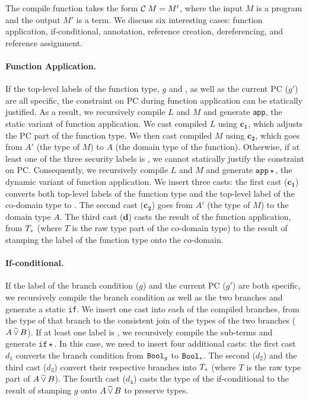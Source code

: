 {\color{NavyBlue} %

The compile function takes the form $\mathcal{C}\;{M} = M'$, where the input $M$ is a
\Surface program and the output $M'$ is a \CC term. We discuss six interesting
cases: function application, if-conditional, annotation, reference creation,
dereferencing, and reference assignment.

\paragraph{Function Application.}
If the top-level labels of the function type, $g$ and \gc, as well as the
current PC ($g'$) are all specific, the constraint on PC during function
application can be statically justified. As a result, we recursively compile $L$
and $M$ and generate \texttt{app}, the static variant of function application.
We cast compiled $L$ using $\bm{c_1}$, which adjusts the PC part of the function
type. We then cast compiled $M$ using $\bm{c_2}$, which goes from $A'$ (the type
of $M$) to $A$ (the domain type of the function). Otherwise, if at least one of
the three security labels is \unk, we cannot statically justify the constraint
on PC. Consequently, we recursively compile $L$ and $M$ and generate
$\mathtt{app}{\star}$, the dynamic variant of function application. We insert
three casts: the first cast ($\bm{c_1}$) converts both top-level labels of the
function type and the top-level label of the co-domain type to \unk. The second
cast ($\bm{c_2}$) goes from $A'$ (the type of $M$) to the domain type $A$. The
third cast ($\bm{d}$) casts the result of the function application, from
$T_{\unk}$ (where $T$ is the raw type part of the co-domain type) to the result
of stamping the label of the function type onto the co-domain.

\paragraph{If-conditional.}
If the label of the branch condition ($g$) and the current PC ($g'$) are both
specific, we recursively compile the branch condition as well as the two
branches and generate a static \texttt{if}. We insert one cast into each of the
compiled branches, from the type of that branch to the consistent join of the
types of the two branches ($A \,\widetilde{\vee}\, B$). If at least one label is \unk, we
recursively compile the sub-terms and generate $\mathtt{if}{\star}$. In this
case, we need to insert four additional casts: the first cast $d_1$ converts the
branch condition from $\mathtt{Bool}_g$ to $\Bool_{\unk}$. The second ($d_2$) and the
third cast ($d_3$) convert their respective branches into $T_{\unk}$ (where $T$
is the raw type part of $A \,\widetilde{\vee}\, B$). The fourth cast ($d_4$) casts the
type of the if-conditional to the result of stamping $g$ onto $A \,\widetilde{\vee}\, B$
to preserve types.

}
